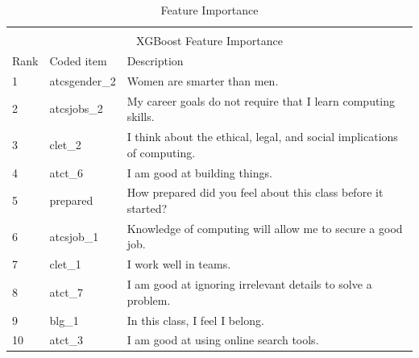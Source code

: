 \setlength{\extrarowheight}{1.5pt}
\begin{table}[!htbp]
\caption{Feature Importance} %
\centering %
\begin{tabular}{|l|l|p{10cm}|} %
\hline %


\multicolumn{3}{|c|}{}\\
\multicolumn{3}{|c|}{XGBoost Feature Importance}\\[5pt]
\hline
Rank & Coded item & Description\\[0.5ex]
\hline %

1 & atcsgender\_2 &  Women are smarter than men. \\
2 & atcsjobs\_2 & My career goals do not require that I learn computing skills. \\
3 & clet\_2 &  I think about the ethical, legal, and social implications of computing.\\
4 & atct\_6 & I am good at building things.\\
5 & prepared & How prepared did you feel about this class before it started? \\
6 & atcsjob\_1 & Knowledge of computing will allow me to secure a good job. \\
7 & clet\_1 & I work well in teams. \\
8 & atct\_7 & I am good at ignoring irrelevant details to solve a problem. \\
9 & blg\_1 & In this class, I feel I belong. \\
10 & atct\_3 &  I am good at using online search tools. \\

\hline%
\end{tabular}
\label{tableFeatureImportance}{}
\end{table}

